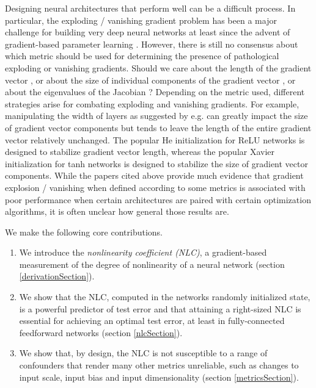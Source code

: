 \documentclass{article} %
\begin{document}
Designing neural architectures that perform well can be a difficult process. In particular, the exploding / vanishing gradient problem has been a major challenge for building very deep neural networks at least since the advent of gradient-based parameter learning \citep{hochreiterThesis,LSTM,RNNvanishingGradient}. However, there is still no consensus about which metric should be used for determining the presence of pathological exploding or vanishing gradients. Should we care about the length of the gradient vector \citep{heInit}, or about the size of individual components of the gradient vector \citep{depthScalesMeanField,resNetMeanField,normalizedInitialization}, or about the eigenvalues of the Jacobian \citep{orthogonalInitialization,explodingPascanu,eigenspectrum}? Depending on the metric used, different strategies arise for combating exploding and vanishing gradients. For example, manipulating the width of layers as suggested by e.g. \citet{resNetMeanFieldHacking,pyramidal} can greatly impact the size of gradient vector components but tends to leave the length of the entire gradient vector relatively unchanged. The popular He initialization for ReLU networks \citep{heInit} is designed to stabilize gradient vector length, whereas the popular Xavier initialization for tanh networks \citep{normalizedInitialization} is designed to stabilize the size of gradient vector components. While the papers cited above provide much evidence that gradient explosion / vanishing when defined according to some metrics is associated with poor performance when certain architectures are paired with certain optimization algorithms, it is often unclear how general those results are.


We make the following core contributions.

\begin{enumerate}
\item We introduce the {\it nonlinearity coefficient (NLC)}, a gradient-based measurement of the degree of nonlinearity of a neural network (section \ref{derivationSection}).
\item We show that the NLC, computed in the networks randomly initialized state, is a powerful predictor of test error and that attaining a right-sized NLC is essential for achieving an optimal test error, at least in fully-connected feedforward networks (section \ref{nlcSection}).
\item We show that, by design, the NLC is not susceptible to a range of confounders that render many other metrics unreliable, such as changes to input scale, input bias and input dimensionality (section \ref{metricsSection}).
\end{enumerate}
\end{document}
